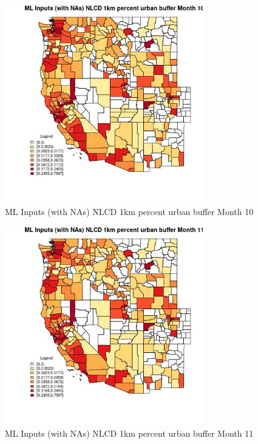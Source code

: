 \begin{figure} 
\centering  
\includegraphics[width=0.77\textwidth]{Code_Outputs/Report_ML_input_PM25_Step4_part_f_de_duplicated_aveswNAs_CountyNLCD_1km_percent_urban_buffermedianMonth10.jpg} 
\caption{\label{fig:Report_ML_input_PM25_Step4_part_f_de_duplicated_aveswNAsCountyNLCD_1km_percent_urban_buffermedianMonth10}ML Inputs (with NAs) NLCD 1km percent urban buffer Month 10} 
\end{figure} 
 

\clearpage 

\begin{figure} 
\centering  
\includegraphics[width=0.77\textwidth]{Code_Outputs/Report_ML_input_PM25_Step4_part_f_de_duplicated_aveswNAs_CountyNLCD_1km_percent_urban_buffermedianMonth11.jpg} 
\caption{\label{fig:Report_ML_input_PM25_Step4_part_f_de_duplicated_aveswNAsCountyNLCD_1km_percent_urban_buffermedianMonth11}ML Inputs (with NAs) NLCD 1km percent urban buffer Month 11} 
\end{figure} 
 

